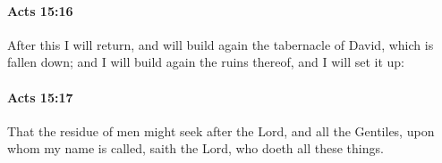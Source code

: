 		\paragraph{Acts 15:16} %
			\label{ACTS-15-16}

			After this I will return, and will build again the tabernacle of David, which is fallen down; and I will build again the ruins thereof, and I will set it up:

			\begin{framed}
			\scriptsize
				\begin{compactdesc}
					\item[SBLG] 
				\end{compactdesc}
			\end{framed}

		\paragraph{Acts 15:17} %
			\label{ACTS-15-17}

			That the residue of men might seek after the Lord, and all the Gentiles, upon whom my name is called, saith the Lord, who doeth all these things.

